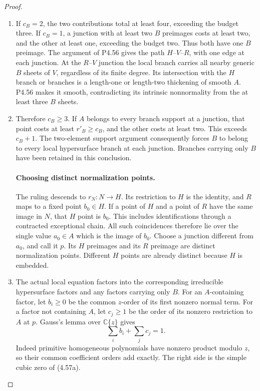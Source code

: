 \begin{proof}
\begin{enumerate}[label={$\langle1\rangle$\arabic*.},leftmargin=*]
\item If $c_B=2$, the two contributions total at least four,
exceeding the budget three. If $c_B=1$, a junction with
at least two $B$ preimages costs at least two, and the
other at least one, exceeding the budget two. Thus both
have one $B$ preimage. The argument of P4.56 gives the
path $H$--$V$--$R$, with one edge at each junction.
At the $R$--$V$ junction the local branch carries all
nearby generic $B$ sheets of $V$, regardless of its
finite degree. Its intersection with the $H$ branch or
branches is a length-one or length-two thickening of
smooth $A$. P4.56 makes it smooth, contradicting its
intrinsic nonnormality from the at least three $B$ sheets.

\item Therefore $c_B\ge3$. If $A$ belongs to every branch
support at a junction, that point costs at least
$r'_B\ge c_B$, and the other costs at least two.
This exceeds $c_B+1$. The two-element support argument
consequently forces $B$ to belong to every local
hypersurface branch at each junction. Branches carrying
only $B$ have been retained in this conclusion.

\paragraph{Choosing distinct normalization points.}
The ruling descends to $r_N:N\to H$. Its restriction
to $H$ is the identity, and $R$ maps to a fixed point
$b_0\in H$. If a point of $H$ and a point of $R$ have
the same image in $N$, that $H$ point is $b_0$.
This includes identifications through a contracted
exceptional chain. All such coincidences therefore lie
over the single value $a_0\in A$ which is the image of
$b_0$. Choose a junction different from $a_0$, and call
it $p$. Its $H$ preimages and its $R$ preimage are
distinct normalization points. Different $H$ points
are already distinct because $H$ is embedded.

\item The actual local equation factors into the corresponding
irreducible hypersurface factors and any factors carrying
only $B$. For an $A$-containing factor, let $b_i\ge0$
be the common $z$-order of its first nonzero normal term.
For a factor not containing $A$, let $c_j\ge1$ be the
order of its nonzero restriction to $A$ at $p$.
Gauss's lemma over $\mathbb C\{z\}$ gives
\[
                         \sum_i b_i+\sum_j c_j=1.         \tag{4.57b}
\]
Indeed primitive homogeneous polynomials have nonzero
product modulo $z$, so their common coefficient orders
add exactly. The right side is the simple cubic zero
of (4.57a).


\end{enumerate}
\end{proof}
